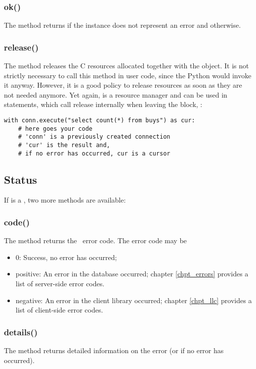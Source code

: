\subsubsection{ok()}
The method returns 
if the instance does not represent
an error and  otherwise.

\subsubsection{release()}
The method releases the C resources
allocated together with the  object.
It is not strictly necessary to call
this method in user code, since the
Python  would invoke it anyway.
However, it is a good policy
to release resources as soon as
they are not needed anymore.
Yet again,  is a resource manager
and can be used in  statements,
which call release internally when leaving
the block, \eg:

\begin{python}
\begin{lstlisting}
with conn.execute("select count(*) from buys") as cur:
    # here goes your code
    # 'conn' is a previously created connection
    # 'cur' is the result and,
    # if no error has occurred, cur is a cursor
\end{lstlisting}
\end{python}

\subsection{Status}
If  is a ,
two more methods are available:

\subsubsection{code()}
The method returns the \nowdb\ error code.
The error code may be
\begin{itemize}
\item 0: Success, no error has occurred;
\item positive:
An error in the database occurred;
chapter \ref{chpt_errors} provides a list
of server-side error codes.
\item negative:
An error in the client library occurred;
chapter \ref{chpt_llc} provides a list
of client-side error codes.
\end{itemize}

\subsubsection{details()}
The method returns
detailed information on the error
(or  if no error has occurred).

